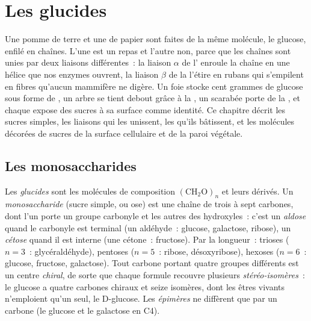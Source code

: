 \chapter{Les glucides}\label{ch:b1:carbohydrates}

Une pomme de terre et une  de papier sont faites de la même
molécule, le glucose, enfilé en chaînes. L'une est un repas et l'autre
non, parce que les chaînes sont unies par deux liaisons différentes~: la
liaison $\alpha$ de l' enroule la chaîne en une hélice que nos
enzymes ouvrent, la liaison $\beta$ de la  l'étire en rubans
qui s'empilent en fibres qu'aucun mammifère ne digère. Un foie stocke
cent grammes de glucose sous forme de , un arbre se tient
debout grâce à la , un scarabée porte de la , et chaque
 expose des sucres à sa surface comme identité. Ce chapitre
décrit les sucres simples, les liaisons qui les unissent, les
 qu'ils bâtissent, et les molécules décorées de sucres de
la surface cellulaire et de la paroi végétale.

\section{Les monosaccharides}

\begin{definition}[Monosaccharide]\label{def:b1:carbohydrates:monosaccharide}
Les \emph{glucides} sont les molécules de composition
$(\mathrm{CH_2O})_n$ et leurs dérivés. Un
\emph{monosaccharide} (sucre simple, ou ose) est
une chaîne de trois à sept carbones, dont l'un porte un groupe carbonyle
et les autres des hydroxyles~: c'est un \emph{aldose}
quand le carbonyle est terminal (un aldéhyde~: glucose, galactose,
ribose), un \emph{cétose} quand il est interne (une
cétone~: fructose). Par la longueur~: trioses ($n = 3$~:
glycéraldéhyde), pentoses ($n = 5$~: ribose, désoxyribose), hexoses
($n = 6$~: glucose, fructose, galactose). Tout carbone portant quatre
groupes différents est un centre \emph{chiral}, de sorte que chaque
formule recouvre plusieurs \emph{stéréo-isomères}~: le glucose a quatre
carbones chiraux et seize isomères, dont les êtres vivants n'emploient
qu'un seul, le D-glucose. Les \emph{épimères} ne diffèrent que par un
carbone (le glucose et le galactose en C4).
\end{definition}

